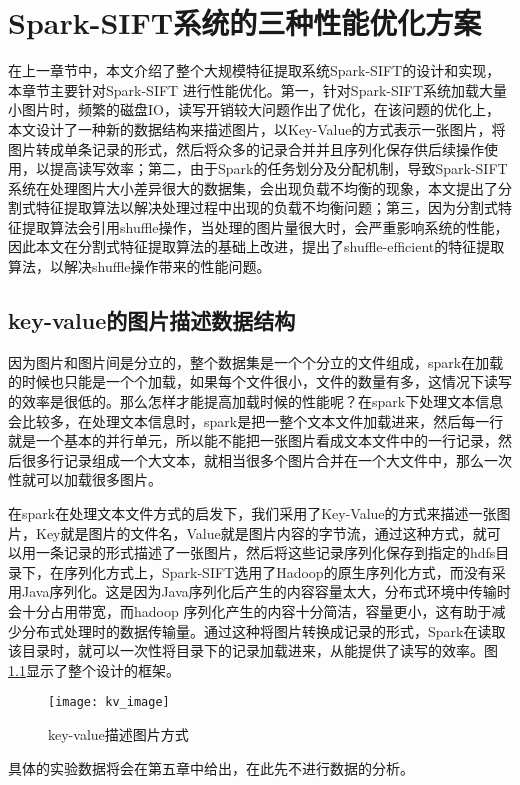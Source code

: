 ﻿\chapter{Spark-SIFT系统的三种性能优化方案}
在上一章节中，本文介绍了整个大规模特征提取系统Spark-SIFT的设计和实现，本章节主要针对Spark-SIFT 进行性能优化。第一，针对Spark-SIFT系统加载大量小图片时，频繁的磁盘IO，读写开销较大问题作出了优化，在该问题的优化上，本文设计了一种新的数据结构来描述图片，以Key-Value的方式表示一张图片，将图片转成单条记录的形式，然后将众多的记录合并并且序列化保存供后续操作使用，以提高读写效率；第二，由于Spark的任务划分及分配机制，导致Spark-SIFT系统在处理图片大小差异很大的数据集，会出现负载不均衡的现象，本文提出了分割式特征提取算法以解决处理过程中出现的负载不均衡问题；第三，因为分割式特征提取算法会引用shuffle操作，当处理的图片量很大时，会严重影响系统的性能，因此本文在分割式特征提取算法的基础上改进，提出了shuffle-efficient的特征提取算法，以解决shuffle操作带来的性能问题。

\section{key-value的图片描述数据结构}
因为图片和图片间是分立的，整个数据集是一个个分立的文件组成，spark在加载的时候也只能是一个个加载，如果每个文件很小，文件的数量有多，这情况下读写的效率是很低的。那么怎样才能提高加载时候的性能呢？在spark下处理文本信息会比较多，在处理文本信息时，spark是把一整个文本文件加载进来，然后每一行就是一个基本的并行单元，所以能不能把一张图片看成文本文件中的一行记录，然后很多行记录组成一个大文本，就相当很多个图片合并在一个大文件中，那么一次性就可以加载很多图片。

在spark在处理文本文件方式的启发下，我们采用了Key-Value的方式来描述一张图片，Key就是图片的文件名，Value就是图片内容的字节流，通过这种方式，就可以用一条记录的形式描述了一张图片，然后将这些记录序列化保存到指定的hdfs目录下，在序列化方式上，Spark-SIFT选用了Hadoop的原生序列化方式，而没有采用Java序列化。这是因为Java序列化后产生的内容容量太大，分布式环境中传输时会十分占用带宽，而hadoop 序列化产生的内容十分简洁，容量更小，这有助于减少分布式处理时的数据传输量。通过这种将图片转换成记录的形式，Spark在读取该目录时，就可以一次性将目录下的记录加载进来，从能提供了读写的效率。图\ref{fig:kv_image}显示了整个设计的框架。
\begin{figure}[htp]
\centering
\texttt{[image: kv\_image]}
\caption{key-value描述图片方式}
\label{fig:kv_image}
\end{figure}

具体的实验数据将会在第五章中给出，在此先不进行数据的分析。
